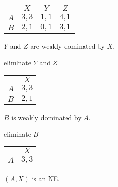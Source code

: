 \documentclass[12pt,letterpaper]{report}
\begin{document}
\begin{ex}
  \begin{minipage}{0.4\textwidth}
    \centering
    \renewcommand{\arraystretch}{1.25}
    \begin{tabular}{c |c|c|c|}
      \multicolumn{1}{c}{} & \multicolumn{1}{c}{$X$} & \multicolumn{1}{c}{$Y$}
        & \multicolumn{1}{c}{$Z$} \\
      \cline{2-4}
      $A$ & $3, 3$ & $1, 1$ & $4, 1$ \\
      \cline{2-4}
      $B$ & $2, 1$ & $0, 1$ & $3, 1$ \\
      \cline{2-4}
    \end{tabular}
  \end{minipage}\hfill\begin{minipage}{0.6\textwidth}
    $Y$ and $Z$ are weakly dominated by $X$.
  \end{minipage}

  \hspace{0.2\textwidth} \scalebox{2}{$\downarrow$} \quad eliminate $Y$ and $Z$

  \begin{minipage}{0.4\textwidth}
    \centering
    \renewcommand{\arraystretch}{1.25}
    \begin{tabular}{c |c|}
      \multicolumn{1}{c}{} & \multicolumn{1}{c}{$X$} \\
      \cline{2-2}
      $A$ & $3, 3$ \\
      \cline{2-2}
      $B$ & $2, 1$ \\
      \cline{2-2}
    \end{tabular}
  \end{minipage}\hfill\begin{minipage}{0.6\textwidth}
    $B$ is weakly dominated by $A$.
  \end{minipage}

  \hspace{0.2\textwidth} \scalebox{2}{$\downarrow$} \quad eliminate $B$

  \begin{minipage}{0.4\textwidth}
    \centering
    \renewcommand{\arraystretch}{1.25}
    \begin{tabular}{c |c|}
      \multicolumn{1}{c}{} & \multicolumn{1}{c}{$X$} \\
      \cline{2-2}
      $A$ & $3, 3$ \\
      \cline{2-2}
    \end{tabular}
  \end{minipage}\hfill\begin{minipage}{0.6\textwidth}
    $(A, X)$ is an NE.
  \end{minipage}
\end{ex}
\end{document}
